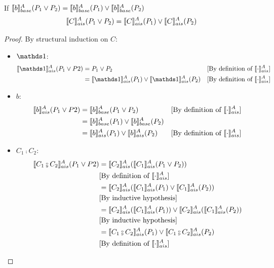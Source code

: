 \documentclass[
  10pt,       %
  twoside,    %
  a4paper,    %
  english,    %
  tikz,       %
  openright,  %
]{book}
\begin{document}
\begin{theorem} $\;$\\
  \label{thm:additivity}
  If $\llbracket b \rrbracket_{base}^A(P_1 \lor P_2) = \llbracket b \rrbracket_{base}^A(P_1) \lor \llbracket b \rrbracket_{base}^A(P_2)$
  $$\llbracket C \rrbracket_{ais}^{A}(P_1 \lor P_2) = \llbracket C \rrbracket_{ais}^{A}(P_1) \lor \llbracket C \rrbracket_{ais}^{A}(P_2)$$
\end{theorem}
\begin{proof}
  By structural induction on $C$:
  \begin{itemize}
    \item $\sskip$:
      \begin{align*}
        \asem{\sskip}(P_1 \join P2)
          &= P_1 \join P_2 
          &\text{[By definition of $\asem{\cdot}$]} \\
          &= \asem{\sskip}(P_1) \join \asem{\sskip}(P_2)
          &\text{[By definition of $\asem{\cdot}$]} \\
      \end{align*}
    \item $b$:
      \begin{align*}
        \llbracket b \rrbracket_{ais}^{A}(P_1 \lor P2)
          &= \llbracket b \rrbracket_{base}^A(P_1 \lor P_2)
          &\text{[By definition of $\llbracket \cdot \rrbracket_{ais}^{A}$]} \\
          &= \llbracket b \rrbracket_{base}^A(P_1) \lor \llbracket b \rrbracket_{base}^A(P_2) \\
          &= \llbracket b \rrbracket_{ais}^{A}(P_1) \lor \llbracket b \rrbracket_{ais}^{A}(P_2)
          &\text{[By definition of $\llbracket \cdot \rrbracket_{ais}^{A}$]} \\
      \end{align*}
    \item $C_1 \fcmp C_2$:
      \begin{align*}
        \asem{C_1 \fcmp C_2}(P_1 \join P2)
          &= \asem{C_2}(\asem{C_1}(P_1 \join P_2)) \\
          &\text{[By definition of $\asem{\cdot}$]} \\
          &= \asem{C_2}(\asem{C_1}(P_1) \join \asem{C_1}(P_2)) \\
          &\text{[By inductive hypothesis]} \\
          &= \asem{C_2}(\asem{C_1}(P_1)) \join \asem{C_2}(\asem{C_1}(P_2)) \\
          &\text{[By inductive hypothesis]} \\
          &= \asem{C_1 \fcmp C_2}(P_1) \join \asem{C_1 \fcmp C_2}(P_2) \\
          &\text{[By definition of $\asem{\cdot}$]} \\
      \end{align*}

\end{itemize}
\end{proof}
\end{document}
